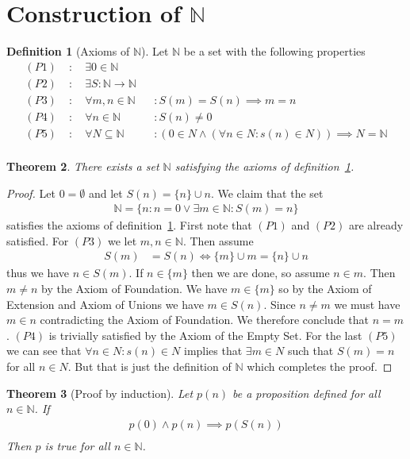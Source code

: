 \documentclass[a4paper,11pt]{article}
\theoremstyle{plain}
\newtheorem{theorem}{Theorem}
\theoremstyle{definition}
\newtheorem{definition}[theorem]{Definition}
\newcommand{\N}{\mathbb{N}}
\newcommand{\iff}{\Longleftrightarrow}
\begin{document}
\section{Construction of $\N$}
\begin{definition}[Axioms of $\N$]\label{nat axioms}
	Let $\N$ be a set with the following properties
	\begin{align*}
		(P1)\; &:\quad \exists 0\in\N\\
		(P2)\; &:\quad \exists S:\N\rightarrow\N\\
		(P3)\; &:\quad \forall m,n\in\N &&: S(m)=S(n)\implies m=n\\
		(P4)\; &:\quad \forall n\in\N &&: S(n)\neq 0\\
		(P5)\; &:\quad \forall N\subseteq\N &&: 
		(0\in N\land(\forall n\in N:s(n)\in N))\implies N=\N\\
	\end{align*}
\end{definition}
\begin{theorem}\label{nat proof}
	There exists a set $\N$ satisfying the axioms of
	definition~\ref{nat axioms}.
\end{theorem}
\begin{proof}
	Let $0=\emptyset$ and let $S(n)=\{n\}\cup n$. We claim that the set
	\begin{align*}
		\N =\{n:n=0\lor\exists m\in\N:S(m)=n\}
	\end{align*}
	satisfies the axioms of definition~\ref{nat axioms}. First note
	that $(P1)$ and $(P2)$ are already satisfied. For $(P3)$ we let
	$m,n\in\N$. Then assume
	\begin{align*}
		S(m)&=S(n)\iff \{m\}\cup m=\{n\}\cup n
	\end{align*}
	thus we have $n\in S(m)$. If $n\in\{m\}$ then we are done, so
	assume $n\in m$. Then $m\neq n$ by the Axiom of Foundation. We
	have $m\in \{m\}$ so by the Axiom of Extension and Axiom of
	Unions we have $m\in S(n)$. Since $n\neq m$ we must have $m\in
	n$ contradicting the Axiom of Foundation. We therefore conclude
	that $n=m$. $(P4)$ is trivially satisfied by the Axiom of the
	Empty Set. For the last $(P5)$ we can see that $\forall n\in
	N:s(n)\in N$ implies that $\exists m\in N$ such that $S(m)=n$
	for all $n \in N$. But that is just the definition of $\N$
	which completes the proof.
\end{proof}
\begin{theorem}[Proof by induction]\label{induction}
	Let $p(n)$ be a proposition defined for all $n\in \N$. If
	\begin{align*}
		p(0) \land p(n)\implies p(S(n))\\
	\end{align*}
	Then $p$ is true for all $n\in \N$.
\end{theorem}
\end{document}

